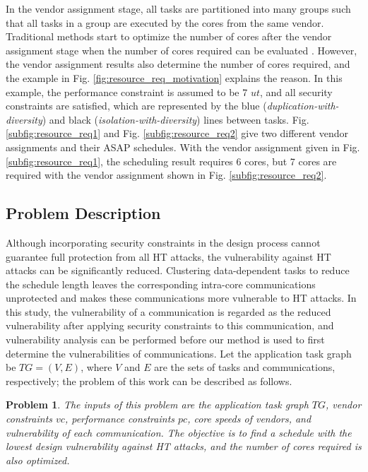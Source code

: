 \documentclass[10pt,journal, compsoc]{IEEEtran}
\newtheorem{problem}{\textbf{Problem}}
\begin{document}
In the vendor assignment stage, all tasks are partitioned into many groups such that all tasks in a group are executed by the cores from the same vendor. Traditional methods start to optimize the number of cores after the vendor assignment stage when the number of cores required can be evaluated \cite{article:YS, article:XC, article:CL, article:NW}. However, the vendor assignment results also determine the number of cores required, and the example in Fig. \ref{fig:resource_req_motivation} explains the reason. In this example, the performance constraint is assumed to be 7 $ut$, and all security constraints are satisfied, which are represented by the blue (\textit{duplication-with-diversity}) and black (\textit{isolation-with-diversity}) lines between tasks. Fig. \ref{subfig:resource_req1} and Fig. \ref{subfig:resource_req2} give two different vendor assignments and their ASAP schedules. With the vendor assignment given in Fig. \ref{subfig:resource_req1}, the scheduling result requires 6 cores, but 7 cores are required with the vendor assignment shown in Fig. \ref{subfig:resource_req2}.






\subsection{Problem Description}

Although incorporating security constraints in the design process cannot guarantee full protection from all HT attacks, the vulnerability against HT attacks can be significantly reduced. Clustering data-dependent tasks to reduce the schedule length leaves the corresponding intra-core communications unprotected and makes these communications more vulnerable to HT attacks. In this study, the vulnerability of a communication is regarded as the reduced vulnerability after applying security constraints to this communication, and vulnerability analysis \cite{conference:HS} can be performed before our method is used to first determine the vulnerabilities of communications. Let the application task graph be $TG=(V,E)$, where $V$ and $E$ are the sets of tasks and communications, respectively; the problem of this work can be described as follows.

\begin{problem}
The inputs of this problem are the application task graph $TG$, vendor constraints $vc$, performance constraints $pc$, core speeds of vendors, and vulnerability of each communication. The objective is to find a schedule with the lowest design vulnerability against HT attacks, and the number of cores required is also optimized.
\end{problem}
\end{document}
